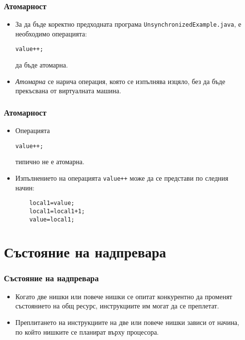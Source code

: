 \documentclass[ignorenonframetext, hyperref=unicode,compress]{beamer}
\begin{document}
\begin{frame}[containsverbatim]
\frametitle{Атомарност}
\begin{itemize}
\item За да бъде коректно предходната програма
\lstinline{UnsynchronizedExample.java}, е необходимо операцията:
\begin{lstlisting}[numbers=none] 
value++;
\end{lstlisting}
да бъде атомарна.
\item {\em Атомарна} се нарича операция, която се изпълнява изцяло, без да бъде
прекъсвана от виртуалната машина.
\end{itemize}
\end{frame}

\begin{frame}[containsverbatim]
\frametitle{Атомарност}
\begin{itemize}
  \item Операцията
  \begin{lstlisting}[numbers=none]
	value++;
  \end{lstlisting}
  типично не е атомарна.
  \item Изпълнението на операцията \lstinline{value++} може да се представи по
  следния начин:
\begin{lstlisting}
	local1=value;
	local1=local1+1;
	value=local1;
\end{lstlisting}
\end{itemize}
\end{frame}

\section{Състояние на надпревара}
\begin{frame}[containsverbatim]
\frametitle{Състояние на надпревара}
\begin{itemize}
  \item Когато две нишки или повече нишки се опитат конкурентно да променят
  състоянието на общ ресурс, инструкциите им могат да се преплетат.
  \item Преплитането на инструкциите на две или повече нишки зависи от
  начина, по който нишките се планират върху процесора.
\end{itemize}
\end{frame}
\end{document}

